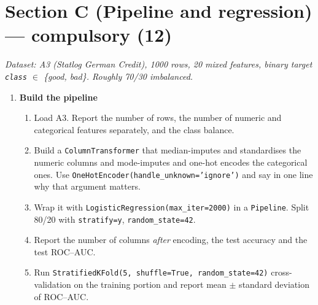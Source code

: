 \documentclass[11pt,a4paper]{article}
\begin{document}
\section*{Section C (Pipeline and regression) --- compulsory \quad (12)}

\noindent\small\emph{Dataset: A3 (Statlog German Credit), 1000 rows, 20 mixed
features, binary target \texttt{class} $\in$ \{good, bad\}. Roughly 70/30
imbalanced.}\normalsize

\begin{enumerate}[label=\textbf{C\arabic*.}, leftmargin=*]

  \item \textbf{Build the pipeline} 
    \begin{enumerate}[label=(\alph*), leftmargin=*]
      \item Load A3. Report the number of rows, the number of numeric and
        categorical features separately, and the class balance.
      \item Build a \texttt{ColumnTransformer} that median-imputes and
        standardises the numeric columns and mode-imputes and one-hot encodes
        the categorical ones. Use
        \texttt{OneHotEncoder(handle\_unknown='ignore')} and say in one line
        why that argument matters.
      \item Wrap it with \texttt{LogisticRegression(max\_iter=2000)} in a
        \texttt{Pipeline}. Split 80/20 with \texttt{stratify=y},
        \texttt{random\_state=42}.
      \item Report the number of columns \emph{after} encoding, the test
        accuracy and the test ROC--AUC.
      \item Run \texttt{StratifiedKFold(5, shuffle=True, random\_state=42)}
        cross-validation on the training portion and report mean $\pm$ standard
        deviation of ROC--AUC.
    \end{enumerate}


\end{enumerate}
\end{document}
